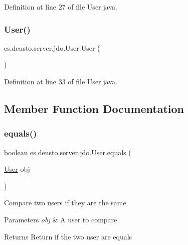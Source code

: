 Definition at line 27 of file User.\+java.

\mbox{\label{classes_1_1deusto_1_1server_1_1jdo_1_1_user_a4d382337425fcc968d350709e15863b1}} 
\subsubsection{\texorpdfstring{User()}{User()}\hspace{0.1cm}{\footnotesize\ttfamily [2/2]}}
{\footnotesize\ttfamily es.\+deusto.\+server.\+jdo.\+User.\+User (\begin{DoxyParamCaption}{ }\end{DoxyParamCaption})\hspace{0.3cm}{\ttfamily [protected]}}



Definition at line 33 of file User.\+java.



\subsection{Member Function Documentation}
\mbox{\label{classes_1_1deusto_1_1server_1_1jdo_1_1_user_a6488131800327e3353fd785d2db06b16}} 
\subsubsection{\texorpdfstring{equals()}{equals()}}
{\footnotesize\ttfamily boolean es.\+deusto.\+server.\+jdo.\+User.\+equals (\begin{DoxyParamCaption}\item[{\hyperlink{classes_1_1deusto_1_1server_1_1jdo_1_1_user}{User}}]{obj }\end{DoxyParamCaption})}

Compare two users if they are the same 
\begin{DoxyParams}{Parameters}
{\em obj} & A user to compare \\
\hline
\end{DoxyParams}
\begin{DoxyReturn}{Returns}
Return if the two user are equals 
\end{DoxyReturn}


